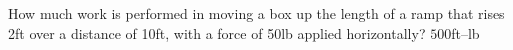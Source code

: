 {How much work is performed in moving a box up the length of a ramp that rises 2ft over a distance of 10ft, with a force of 50lb applied horizontally?
}
{$500$ft--lb
}
